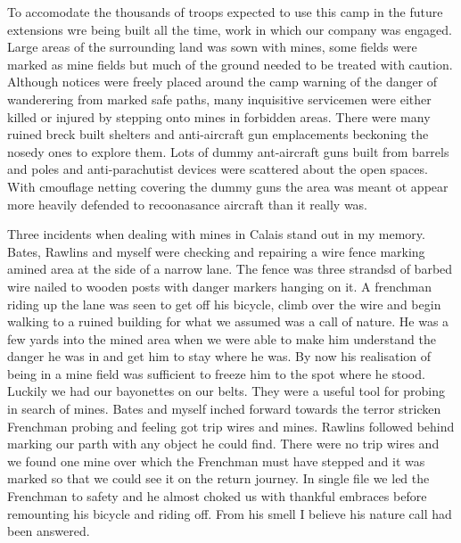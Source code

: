 To accomodate the thousands of troops expected to use this camp in the
future extensions wre being built all the time, work in which our
company was engaged. Large areas of the surrounding land was sown with
mines, some fields were marked as mine fields but much of the ground
needed to be treated with caution. Although notices were freely placed
around the camp warning of the danger of wanderering from marked safe
paths, many inquisitive servicemen were either killed or injured by
stepping onto mines in forbidden areas. There were many ruined breck
built shelters and anti-aircraft gun emplacements beckoning the nosedy
ones to explore them. Lots of dummy ant-aircraft guns built from
barrels and poles and anti-parachutist devices were scattered about
the open spaces. With cmouflage netting covering the dummy guns the
area was meant ot appear more heavily defended to recoonasance
aircraft than it really was.

Three incidents when dealing with mines in Calais stand out in my
memory. \Lcorporal Bates, \sapper Rawlins and myself were checking and
repairing a wire fence marking amined area at the side of a narrow
lane. The fence was three strandsd of barbed wire nailed to wooden
posts with danger markers hanging on it. A frenchman riding up the
lane was seen to get off his bicycle, climb over the wire and begin
walking to a ruined building for what we assumed was a call of
nature. He was a few yards into the mined area when we were able to
make him understand the danger he was in and get him to stay where he
was. By now his realisation of being in a mine field was sufficient to
freeze him to the spot where he stood. Luckily we had our bayonettes
on our belts. They were a useful tool for probing in search of
mines. \Lcorporal Bates and myself inched forward towards the terror
stricken Frenchman probing and feeling got trip wires and
mines. Rawlins followed behind marking our parth with any object he
could find. There were no trip wires and we found one mine over which
the Frenchman must have stepped and it was marked so that we could see
it on the return journey. In single file we led the Frenchman to
safety and he almost choked us with thankful embraces before
remounting his bicycle and riding off. From his smell I believe his
nature call had been answered.

